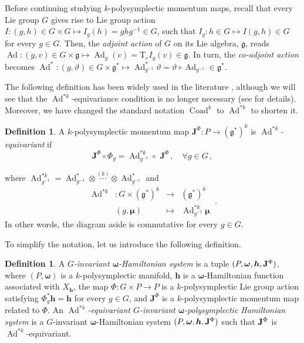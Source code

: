 \documentclass[11pt]{article}
\theoremstyle{plain}
\theoremstyle{definition}
\newtheorem{definition}[theorem]{Definition}
\newcommand{\T}{\mathrm{T}}
\newcommand{\bomega}{{\boldsymbol{\omega}}}
\newcommand{\Lg}{\mathfrak{g}}
\newcommand{\x}{\times}
\DeclareMathOperator{\Ad}{Ad}
\DeclareMathOperator{\Coad}{Coad}
\numberwithin{equation}{section}
\begin{document}
Before continuing studying $k$-polysymplectic momentum maps, recall that every Lie group $G$ gives rise to Lie group action $I:(g,h)\in G\times G\mapsto I_{g}(h)=ghg^{-1}\in G$, such that $I_g:h\in G\mapsto I(g,h)\in G$ for every $g\in G$. Then, the {\it adjoint action} of $G$ on its Lie algebra, $\mathfrak{g}$, reads $\Ad:(g,v)\in G\times\mathfrak{g}\mapsto \Ad_g(v)=\T_eI_g(v)\in  \mathfrak{g}$. In turn, the {\it co-adjoint action} becomes $\Ad^*:(g,\vartheta)\in G\times \mathfrak{g}^*\mapsto \Ad^*_{g^{-1}}\vartheta= \vartheta\circ \Ad_{g^{-1}}\in \mathfrak{g}^*$.

The following definition has been widely used in the literature \cite{MRSV_15}, although we will see that the $\Ad^{*k}$-equivariance condition is no longer necessary (see \cite{LRVZ_23} for details). Moreover, we have changed the standard notation $\Coad^k$ to $\Ad^{*k}$ to shorten it.

\begin{definition}
    A $k$-polysymplectic momentum map $\mathbf{J}^\Phi:P\rightarrow (\Lg^*)^k$ is {\it $\Ad^{*k}$-equivariant} if
    \[
    \mathbf{J}^\Phi\circ \Phi_g =\Ad^{*k}_{g^{-1}}\circ\,\, \mathbf{J}^\Phi\,,\quad \forall g\in G\,,
    \]
    \begin{minipage}{12cm}
    where $\Ad^{*k}_{g^{-1}}=\Ad^*_{g^{-1}}\stackrel{}\otimes \overset{(k)}{\dotsb}\otimes \Ad^*_{g^{-1}}$ and
    \[
    \begin{array}{rccc}
    \Ad^{*k}&:G\x(\Lg^*)^k & \longrightarrow & (\Lg^*)^k\\
    & (g,\boldsymbol \mu) &\longmapsto & \Ad^{*k}_{g^{-1}}\boldsymbol\mu\,
    \end{array}.
    \]
In other words, the diagram aside is commutative for every $g\in G$.
\end{minipage}
\begin{minipage}{4cm}
\end{minipage}
\end{definition}


To simplify the notation, let us introduce the following definition. 

\begin{definition}
 A {\it$G$-invariant $\bomega$-Hamiltonian system} is a tuple $(P,\boldsymbol\omega,\bm h,{\bf J}^\Phi)$, where $(P,\boldsymbol{\bomega})$ is a $k$-polysymplectic manifold, $\bm h$ is a $\bomega$-Hamiltonian function associated with $X_{\bm h}$, the map $\Phi:G\x P\rightarrow P$ is a $k$-polysymplectic Lie group action satisfying $\Phi_g^*\bm h=\bm h$ for every $g\in G$, and $\mathbf{J}^{\Phi}$ is a $k$-polysymplectic momentum map related to $\Phi$. An {\it $\Ad^{*k}$-equivariant $G$-invariant $\bomega$-polysymplectic Hamiltonian system} is a $G$-invariant $\bomega$-Hamiltonian system $(P,\boldsymbol\omega,\bm h,{\bf J}^\Phi)$ such that ${\bf J}^\Phi$  is $\Ad^{*k}$-equivariant.
\end{definition}
\end{document}
